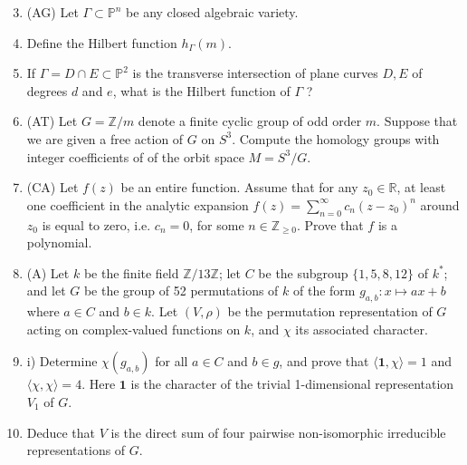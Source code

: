 \documentclass[10pt]{article}
\begin{document}
\begin{enumerate}
  \setcounter{enumi}{2}
  \item (AG) Let $\Gamma \subset \mathbb{P}^{n}$ be any closed algebraic variety.

  \item Define the Hilbert function $h_{\Gamma}(m)$.

  \item If $\Gamma=D \cap E \subset \mathbb{P}^{2}$ is the transverse intersection of plane curves $D, E$ of degrees $d$ and $e$, what is the Hilbert function of $\Gamma$ ?

  \item (AT) Let $G=\mathbb{Z} / m$ denote a finite cyclic group of odd order $m$. Suppose that we are given a free action of $G$ on $S^{3}$. Compute the homology groups with integer coefficients of of the orbit space $M=S^{3} / G$.

  \item (CA) Let $f(z)$ be an entire function. Assume that for any $z_{0} \in \mathbb{R}$, at least one coefficient in the analytic expansion $f(z)=\sum_{n=0}^{\infty} c_{n}\left(z-z_{0}\right)^{n}$ around $z_{0}$ is equal to zero, i.e. $c_{n}=0$, for some $n \in \mathbb{Z}_{\geq 0}$. Prove that $f$ is a polynomial.

  \item (A) Let $k$ be the finite field $\mathbb{Z} / 13 \mathbb{Z}$; let $C$ be the subgroup $\{1,5,8,12\}$ of $k^{*}$; and let $G$ be the group of 52 permutations of $k$ of the form $g_{a, b}: x \mapsto a x+b$ where $a \in C$ and $b \in k$. Let $(V, \rho)$ be the permutation representation of $G$ acting on complex-valued functions on $k$, and $\chi$ its associated character.

  \item i) Determine $\chi\left(g_{a, b}\right)$ for all $a \in C$ and $b \in g$, and prove that $\langle\mathbf{1}, \chi\rangle=1$ and $\langle\chi, \chi\rangle=4$. Here $\mathbf{1}$ is the character of the trivial 1-dimensional representation $V_{1}$ of $G$.

  \item Deduce that $V$ is the direct sum of four pairwise non-isomorphic irreducible representations of $G$.

\end{enumerate}
\end{document}

